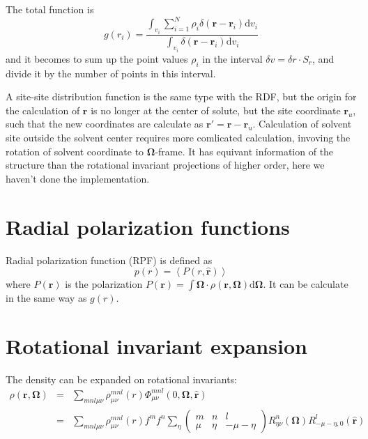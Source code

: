 The total function is 
\begin{equation}
g(r_{i})=\dfrac{\int_{v_{i}}\sum_{i=1}^{N}\rho_{i}\delta(\mathbf{r}-\mathbf{r}_{i})\mathrm{d}v_{i}}{\int_{v_{i}}\delta(\mathbf{r}-\mathbf{r}_{i})\mathrm{d}v_{i}}
\end{equation}
and it becomes to sum up the point values $\rho_{i}$ in the interval
$\delta v=\delta r\cdot S_{r}$, and divide it by the number of points
in this interval.

A site-site distribution function is the same type with the \acs{RDF},
but the origin for the calculation of $\mathbf{r}$ is no longer at
the center of solute, but the site coordinate $\mathbf{r}_{u}$, such
that the new coordinates are calculate as $\mathbf{r}'=\mathbf{r}-\mathbf{r}_{u}$.
Calculation of solvent site outside the solvent center requires more
comlicated calculation, invoving the rotation of solvent coordinate
to $\mathbf{\Omega}$-frame. It has equivant information of the structure
than the rotational invariant projections of higher order, here we
haven't done the implementation.

\section{Radial polarization functions}

Radial polarization function (RPF) is defined as 
\begin{equation}
p(r)=\left\langle P(r,\hat{\mathbf{r}})\right\rangle 
\end{equation}
where $P(\mathbf{r})$ is the polarization $P(\mathbf{r})=\int\mathbf{\Omega}\cdot\rho(\mathbf{r},\mathbf{\Omega})\mathrm{d}\mathbf{\Omega}$.
It can be calculate in the same way as $g(r)$.

\section{Rotational invariant expansion}

The density can be expanded on rotational invariants:
\begin{eqnarray}
\rho(\mathbf{r},\mathbf{\Omega}) & = & \sum_{mnl\mu\nu}\rho_{\mu\nu}^{mnl}(r)\Phi_{\mu\nu}^{mnl}(0,\mathbf{\Omega},\mathbf{\hat{r}})\label{eq:rot_invar_expansion}\\
 & = & \sum_{mnl\mu\nu}\rho_{\mu\nu}^{mnl}(r)f^{m}f^{n}\sum_{\eta}\left(\begin{array}{ccc}
m & n & l\\
\mu & \eta & -\mu-\eta
\end{array}\right)R_{\eta\nu}^{n}(\mathbf{\Omega})R_{-\mu-\eta,0}^{l}(\mathbf{\hat{r}})
\end{eqnarray}

